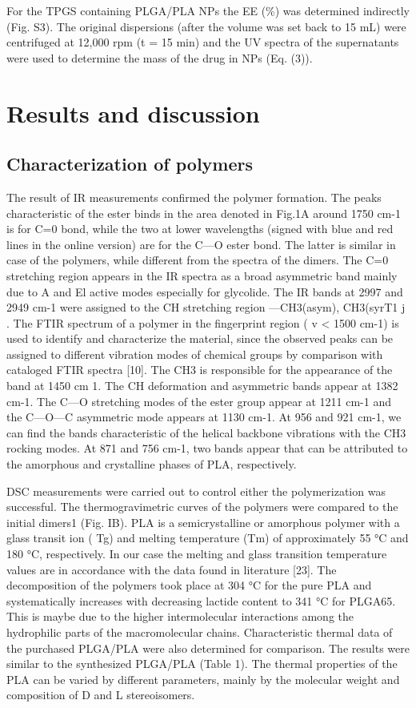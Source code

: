 \documentclass[11pt,letterpaper]{article}
\begin{document}
	For the TPGS containing PLGA/PLA NPs the EE (\%) was determined
	indirectly (Fig. S3). The original dispersions (after the volume was set
	back to 15 mL) were centrifuged at 12,000 rpm (t = 15 min) and the UV
	spectra of the supernatants were used to determine the mass of the drug in NPs (Eq. (3)).
	
	\section{Results and discussion}
	
	\subsection{Characterization of polymers}
	
	The result of IR measurements confirmed the polymer formation.
	The peaks characteristic of the ester binds in the area denoted in Fig.1A
	around 1750 cm-1 is for C=0 bond, while the two at lower wavelengths (signed with blue and red lines in the online version) are for the
	C—O ester bond. The latter is similar in case of the polymers, while
	different from the spectra of the dimers. The C=0 stretching region
	appears in the IR spectra as a broad asymmetric band mainly due to A
	and El active modes especially for glycolide. The IR bands at 2997 and
	2949 cm-1 were assigned to the CH stretching region —CH3(asym),
	CH3(syrT1 j . The FTIR spectrum of a polymer in the fingerprint region
	( v < 1500 cm-1) is used to identify and characterize the material, since
	the observed peaks can be assigned to different vibration modes of
	chemical groups by comparison with cataloged FTIR spectra [10]. The CH3 is responsible for the appearance of the band at 1450 cm 1. The
	CH deformation and asymmetric bands appear at 1382 cm-1. The C—O
	stretching modes of the ester group appear at 1211 cm-1 and the
	C—O—C asymmetric mode appears at 1130 cm-1. At 956 and
	921 cm-1, we can find the bands characteristic of the helical backbone
	vibrations with the CH3 rocking modes. At 871 and 756 cm-1, two
	bands appear that can be attributed to the amorphous and crystalline
	phases of PLA, respectively.
	
	
	DSC measurements were carried out to control either the polymerization was successful. The thermogravimetric curves of the polymers were compared to the initial dimers1 (Fig. IB). PLA is a semicrystalline or amorphous polymer with a glass transit	ion ( Tg) and
	melting temperature (Tm) of approximately 55 °C and 180 °C, respectively. In our case the melting and glass transition temperature values
	are in accordance with the data found in literature [23]. The decomposition of the polymers took place at 304 °C for the pure PLA and
	systematically increases with decreasing lactide content to 341 °C for
	PLGA65. This is maybe due to the higher intermolecular interactions
	among the hydrophilic parts of the macromolecular chains. Characteristic thermal data of the purchased PLGA/PLA were also determined for comparison. The results were similar to the synthesized
	PLGA/PLA (Table 1). The thermal properties of the PLA can be varied
	by different parameters, mainly by the molecular weight and composition of D and L stereoisomers.
\end{document}
